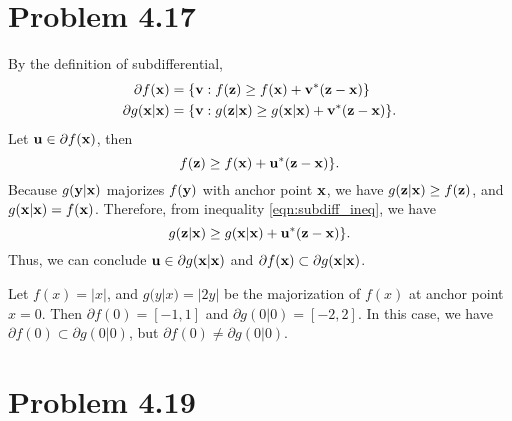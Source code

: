 \documentclass{scrartcl}
\begin{document}
\section*{Problem 4.17}

By the definition of subdifferential,
\begin{equation}
\begin{split}
\partial f(\mathbf{x}) & = \{\mathbf{v}: f(\mathbf{z}) \ge f(\mathbf{x})+\mathbf{v}^*(\mathbf{z}-\mathbf{x})\} \\
\partial g(\mathbf{x}|\mathbf{x}) & = \{\mathbf{v}: g(\mathbf{z}|\mathbf{x}) \ge g(\mathbf{x}|\mathbf{x})+\mathbf{v}^*(\mathbf{z}-\mathbf{x})\}.
\end{split}
\end{equation}
Let $\mathbf{u} \in \partial f(\mathbf{x})$, then
\begin{equation}
f(\mathbf{z}) \ge f(\mathbf{x})+\mathbf{u}^*(\mathbf{z}-\mathbf{x})\}.
\label{eqn:subdiff_ineq}
\end{equation}
Because $g(\mathbf{y}|\mathbf{x})$ majorizes $f(\mathbf{y})$ with anchor point $\mathbf{x}$,
we have $g(\mathbf{z}|\mathbf{x}) \ge f(\mathbf{z})$, and $g(\mathbf{x}|\mathbf{x}) = f(\mathbf{x})$.
Therefore, from inequality \eqref{eqn:subdiff_ineq}, we have
\begin{equation}
g(\mathbf{z}|\mathbf{x}) \ge g(\mathbf{x}|\mathbf{x})+\mathbf{u}^*(\mathbf{z}-\mathbf{x})\}.
\end{equation}
Thus, we can conclude $\mathbf{u} \in \partial g(\mathbf{x}|\mathbf{x})$
and $\partial f(\mathbf{x}) \subset \partial g(\mathbf{x}|\mathbf{x})$.

Let $f(x) = |x|$, and $g(y|x) = |2y|$ be the majorization of $f(x)$ at
anchor point $x=0$.
Then $\partial f(0) = [-1, 1]$ and $\partial g(0|0) = [-2, 2]$.
In this case, we have $\partial f(0) \subset \partial g(0|0)$,
but $\partial f(0) \ne \partial g(0|0)$.


\section*{Problem 4.19}
\end{document}
